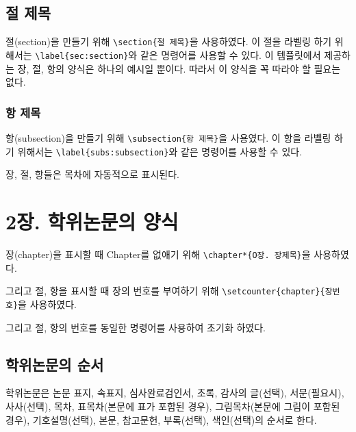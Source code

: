 \documentclass[11pt]{report}
\numberwithin{figure}{chapter}
\begin{document}
\section{절 제목}\label{sec:section}
절(section)을 만들기 위해 \verb|\section{절 제목}|을 사용하였다.
이 절을 라벨링 하기 위해서는 \verb|\label{sec:section}|와 같은 명령어를 사용할 수 있다.
이 템플릿에서 제공하는 장, 절, 항의 양식은 하나의 예시일 뿐이다.
따라서 이 양식을 꼭 따라야 할 필요는 없다.

%
\subsection{항 제목}\label{subs:subsection}
항(subsection)을 만들기 위해 \verb|\subsection{항 제목}|을 사용였다.
이 항을 라벨링 하기 위해서는 \verb|\label{subs:subsection}|와 같은 명령어를 사용할 수 있다.

장, 절, 항들은 목차에 자동적으로 표시된다.

\chapter*{2장. 학위논문의 양식}
\setcounter{chapter}{2}
\setcounter{section}{0}
\setcounter{subsection}{0}

장(chapter)을 표시할 때 Chapter를 없애기 위해 \verb|\chapter*{O장. 장제목}|을 사용하였다.\par
그리고 절, 항을 표시할 때 장의 번호를 부여하기 위해 \verb|\setcounter{chapter}{장번호}|을 사용하였다.\par
그리고 절, 항의 번호를 동일한 명령어를 사용하여 초기화 하였다.\par

\section{학위논문의 순서} \label{sec:order}


학위논문은 논문 표지, 속표지, 심사완료검인서, 초록, 감사의 글(선택), 서문(필요시), 사사(선택), 목차, 표목차(본문에 표가 포함된 경우), 그림목차(본문에 그림이 포함된 경우), 기호설명(선택), 본문, 참고문헌, 부록(선택), 색인(선택)의 순서로 한다.
\end{document}
